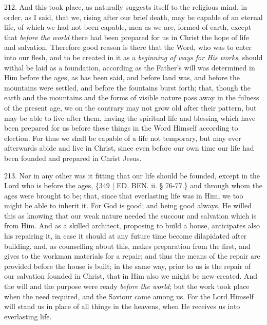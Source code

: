 212. And this took place, as
naturally suggests itself to the religious mind, in order, as I said,
that we, rising after our brief death, may be capable of an eternal
life, of which we had not been capable, men as we are, formed of
earth, except that \emph{before the world} there had been prepared for
us in Christ the hope of life and salvation. Therefore good reason is
there that the Word, who was to enter into our flesh, and to be
created in it as a \emph{beginning of ways for His works}, should
withal be laid as a foundation, according as the Father's will was
determined in Him before the ages, as has been said, and before land
was, and before the mountains were settled, and before the fountains
burst forth; that, though the earth and the mountains and the forms of
visible nature pass away in the fulness of the present age, we on the
contrary may not grow old after their pattern, but may be able to live
after them, having the spiritual life and blessing which have been
prepared for us before these things in the Word Himself according to
election. For thus we shall be capable of a life not temporary, but
may ever afterwards abide and live in Christ, since even before our
own time our life had been founded and prepared in Christ Jesus.

213. Nor in any other was it
fitting that our life should be founded, except in the Lord who is
before the ages, \{349 | ED.
BEN. ii. § 76-77.\} and through whom the ages
were brought to be; that, since that everlasting life was in Him, we
too might be able to inherit it. For God is good; and being good
always, He willed this as knowing that our weak nature needed the
succour and salvation which is from Him. And as a skilled architect,
proposing to build a house, anticipates also his repairing it, in case
it should at any future time become dilapidated after building, and,
as counselling about this, makes preparation from the first, and gives
to the workman materials for a repair; and thus the means of the
repair are provided before the house is built; in the same way, prior
to us is the repair of our salvation founded in Christ, that in Him
also we might be new-created. And the will and the purpose were ready \emph{before
the world}; but the work took place when the need required, and the
Saviour came among us. For the Lord Himself will stand us in place of
all things in the heavens, when He receives us into everlasting life.

